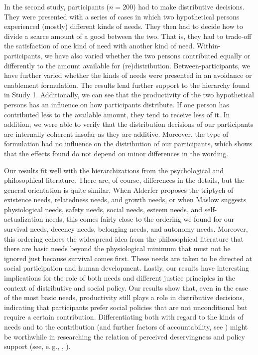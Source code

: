 \documentclass[egregdoesnotlikesansseriftitles]{scrartcl}
\begin{document}
In the second study, participants ($n = 200$) had to make distributive decisions.
They were presented with a series of cases in which two hypothetical persons experienced (mostly) different kinds of needs.
They then had to decide how to divide a scarce amount of a good between the two.
That is, they had to trade-off the satisfaction of one kind of need with another kind of need.
Within-participants, we have also varied whether the two persons contributed equally or differently to the amount available for (re)distribution.
Between-participants, we have further varied whether the kinds of needs were presented in an avoidance or enablement formulation.
The results lend further support to the hierarchy found in Study 1.
Additionally, we can see that the productivity of the two hypothetical persons has an influence on how participants distribute.
If one person has contributed less to the available amount, they tend to receive less of it.
In addition, we were able to verify that the distribution decisions of our participants are internally coherent insofar as they are additive.
Moreover, the type of formulation had no influence on the distribution of our participants, which shows that the effects found do not depend on minor differences in the wording.

Our results fit well with the hierarchizations from the psychological and philosophical literature. There are, of course, differences in the details, but the general orientation is quite similar.
When Alderfer proposes the triptych of existence needs, relatedness needs, and growth needs, or when Maslow suggests physiological needs, safety needs, social needs, esteem needs, and self-actualization needs, this comes fairly close to the ordering we found for our survival needs, decency needs, belonging needs, and autonomy needs.
Moreover, this ordering echoes the widespread idea from the philosophical literature that there are basic needs beyond the physiological minimum that must not be ignored just because survival comes first.
These needs are taken to be directed at social participation and human development.
Lastly, our results have interesting implications for the role of both needs and different justice principles in the context of distributive and social policy.
Our results show that, even in the case of the most basic needs, productivity still plays a role in distributive decisions, indicating that participants prefer social policies that are not unconditional but require a certain contribution.
Differentiating both with regard to the kinds of needs and to the contribution (and further factors of accountability, see \citealt{bauer_need_2022}) might be worthwhile in researching the relation of perceived deservingness and policy support (see, e.\,g., \citealt{gielens_deservingness_2019}, \citealt{heuer_unravelling_2020}).
\end{document}
